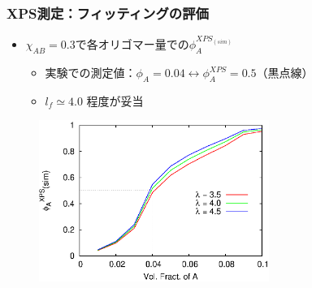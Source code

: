 \documentclass[unicode,12pt]{beamer}%
\begin{document}
\begin{frame}\frametitle{XPS測定：フィッティングの評価}

\begin{itemize}
	\item $\chi_{AB} = 0.3$で各オリゴマー量での$\phi_A^{{XPS}_(sim)}$
	\begin{itemize}
		\item 実験での測定値：$\phi_A = 0.04 \leftrightarrow \phi_A^{XPS} = 0.5 $（黒点線）
		\item $l_f \simeq 4.0$ 程度が妥当
	\end{itemize}
\end{itemize}

\vspace{-0.5\baselineskip}
\begin{figure}[htbp]
	\begin{center}
		\includegraphics[width=75mm]{XPS_Chi_sin_03.eps}
	\end{center}
\end{figure}


\end{frame}
\end{document}

